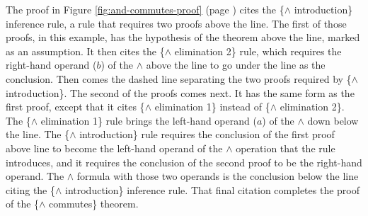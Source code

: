 The proof in
Figure \ref{fig:and-commutes-proof} (page \pageref{fig:and-commutes-proof})
cites the \{$\wedge$ introduction\} inference rule,
a rule that requires two proofs above the line.
The first of those proofs, in this example, has the hypothesis
of the theorem above the line, marked as an assumption.
It then cites the \{$\wedge$ elimination 2\} rule,
which requires the right-hand operand ($b$) of the $\wedge$
above the line to go under the line as the conclusion.
Then comes the dashed line separating
the two proofs required by \{$\wedge$ introduction\}.
The second of the proofs comes next.
It has the same form as the first proof,
except that it cites \{$\wedge$ elimination 1\} instead of \{$\wedge$ elimination 2\}.
The \{$\wedge$ elimination 1\} rule brings the left-hand operand ($a$) of the $\wedge$
down below the line.
The \{$\wedge$ introduction\} rule requires the
conclusion of the first proof above line to
become the left-hand operand of the $\wedge$
operation that the rule introduces,
and it requires the conclusion of the second
proof to be the right-hand operand.
The $\wedge$ formula with those two operands
is the conclusion below the line citing the \{$\wedge$ introduction\} inference rule.
That final citation completes the proof of the \{$\wedge$ commutes\} theorem.

